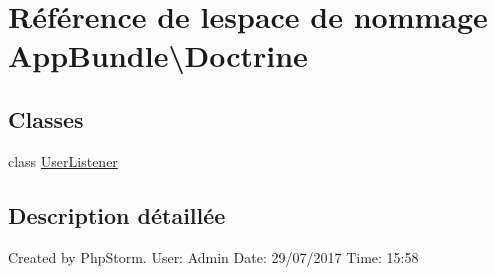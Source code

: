 \hypertarget{namespaceAppBundle_1_1Doctrine}{}\section{Référence de l\textquotesingle{}espace de nommage App\+Bundle\textbackslash{}Doctrine}
\label{namespaceAppBundle_1_1Doctrine}
\subsection*{Classes}
\begin{DoxyCompactItemize}
\item 
class \hyperlink{classAppBundle_1_1Doctrine_1_1UserListener}{User\+Listener}
\end{DoxyCompactItemize}


\subsection{Description détaillée}
Created by Php\+Storm. User\+: Admin Date\+: 29/07/2017 Time\+: 15\+:58 